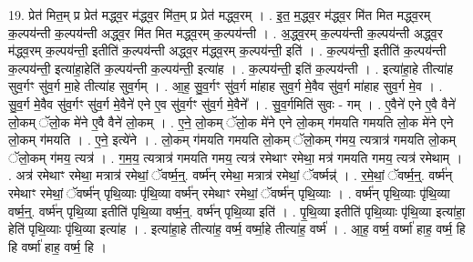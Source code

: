 \documentclass[17pt]{extarticle}
\begin{document}
19. प्रेत॑ मित॒म् प्र प्रेत॑ मद्ध्व॒र म॑द्ध्व॒र मि॑त॒म् प्र प्रेत॑ मद्ध्व॒रम् । . इ॒त॒ म॒द्ध्व॒र म॑द्ध्व॒र मि॑त मित मद्ध्व॒रम् क॒ल्पय॑न्ती क॒ल्पय॑न्ती अद्ध्व॒र मि॑त मित मद्ध्व॒रम् क॒ल्पय॑न्ती । . अ॒द्ध्व॒रम् क॒ल्पय॑न्ती क॒ल्पय॑न्ती अद्ध्व॒र म॑द्ध्व॒रम् क॒ल्पय॑न्ती॒ इतीति॑ क॒ल्पय॑न्ती अद्ध्व॒र म॑द्ध्व॒रम् क॒ल्पय॑न्ती॒ इति॑ । . क॒ल्पय॑न्ती॒ इतीति॑ क॒ल्पय॑न्ती क॒ल्पय॑न्ती॒ इत्या॑हा॒हेति॑ क॒ल्पय॑न्ती क॒ल्पय॑न्ती॒ इत्या॑ह । . क॒ल्पय॑न्ती॒ इति॑ क॒ल्पय॑न्ती । . इत्या॑हा॒हे तीत्या॑ह सुव॒र्गꣳ सु॑व॒र्ग मा॒हे तीत्या॑ह सुव॒र्गम् । . आ॒ह॒ सु॒व॒र्गꣳ सु॑व॒र्ग मा॑हाह सुव॒र्ग मे॒वैव सु॑व॒र्ग मा॑हाह सुव॒र्ग मे॒व । . सु॒व॒र्ग मे॒वैव सु॑व॒र्गꣳ सु॑व॒र्ग मे॒वैने॑ एने ए॒व सु॑व॒र्गꣳ सु॑व॒र्ग मे॒वैने᳚ । . सु॒व॒र्गमिति॑ सुवः - गम् । . ए॒वैने॑ एने ए॒वै वैने॑ लो॒कम् ॅलो॒क मे॑ने ए॒वै वैने॑ लो॒कम् । . ए॒ने॒ लो॒कम् ॅलो॒क मे॑ने एने लो॒कम् ग॑मयति गमयति लो॒क मे॑ने एने लो॒कम् ग॑मयति । . ए॒ने॒ इत्ये॑ने । . लो॒कम् ग॑मयति गमयति लो॒कम् ॅलो॒कम् ग॑मय॒ त्यत्रात्र॑ गमयति लो॒कम् ॅलो॒कम् ग॑मय॒ त्यत्र॑ । . ग॒म॒य॒ त्यत्रात्र॑ गमयति गमय॒ त्यत्र॑ रमेथाꣳ रमेथा॒ मत्र॑ गमयति गमय॒ त्यत्र॑ रमेथाम् । . अत्र॑ रमेथाꣳ रमेथा॒ मत्रात्र॑ रमेथां॒ ॅवर्ष्म॒न्॒. वर्ष्म॑न् रमेथा॒ मत्रात्र॑ रमेथां॒ ॅवर्ष्मन्न्॑ । . र॒मे॒थां॒ ॅवर्ष्म॒न्॒. वर्ष्म॑न् रमेथाꣳ रमेथां॒ ॅवर्ष्म॑न् पृथि॒व्याः पृ॑थि॒व्या वर्ष्म॑न् रमेथाꣳ रमेथां॒ ॅवर्ष्म॑न् पृथि॒व्याः । . वर्ष्म॑न् पृथि॒व्याः पृ॑थि॒व्या वर्ष्म॒न्॒. वर्ष्म॑न् पृथि॒व्या इतीति॑ पृथि॒व्या वर्ष्म॒न्॒. वर्ष्म॑न् पृथि॒व्या इति॑ । . पृ॒थि॒व्या इतीति॑ पृथि॒व्याः पृ॑थि॒व्या इत्या॑हा॒ हेति॑ पृथि॒व्याः पृ॑थि॒व्या इत्या॑ह । . इत्या॑हा॒हे तीत्या॑ह॒ वर्ष्म॒ वर्ष्मा॒हे तीत्या॑ह॒ वर्ष्म॑ । . आ॒ह॒ वर्ष्म॒ वर्ष्मा॑ हाह॒ वर्ष्म॒ हि हि वर्ष्मा॑ हाह॒ वर्ष्म॒ हि । \newline
\end{document}
